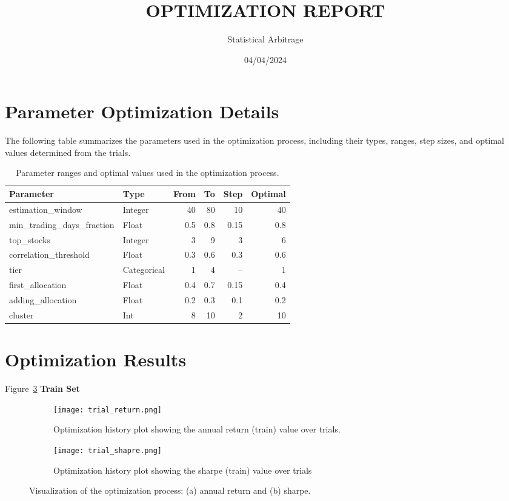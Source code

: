 \documentclass{article}
\title{OPTIMIZATION REPORT}
\author{Statistical Arbitrage}
\date{04/04/2024}
\begin{document}
\maketitle

\section{Parameter Optimization Details}

The following table summarizes the parameters used in the optimization process, including their types, ranges, step sizes, and optimal values determined from the trials.

\begin{table}[h]
\centering
\caption{Parameter ranges and optimal values used in the optimization process.}
\label{tab:parameter_ranges}
\begin{tabular}{llrrrr}
\toprule
\textbf{Parameter} & \textbf{Type} & \textbf{From} & \textbf{To} & \textbf{Step} & \textbf{Optimal} \\
\midrule
estimation\_window & Integer & 40 & 80 & 10 & 40 \\
min\_trading\_days\_fraction & Float & 0.5 & 0.8 & 0.15 & 0.8 \\
top\_stocks & Integer & 3 & 9 & 3 & 6 \\
correlation\_threshold & Float & 0.3 & 0.6 & 0.3 & 0.6 \\
tier & Categorical & 1 & 4 & -- & 1 \\
first\_allocation & Float & 0.4 & 0.7 & 0.15 & 0.4 \\
adding\_allocation & Float & 0.2 & 0.3 & 0.1 & 0.2 \\
cluster & Int & 8 & 10 & 2 & 10\\
\bottomrule
\end{tabular}
\end{table}

\section{Optimization Results}

Figure~\ref{fig:optimization_plots} \textbf{Train Set}
\begin{figure}[h!]
\centering
\begin{subfigure}{0.48\textwidth}
    \texttt{[image: trial\_return.png]}
    \caption{Optimization history plot showing the annual return (train) value over trials.}
    \label{fig:optimization_history}
\end{subfigure}
\hfill
\begin{subfigure}{0.48\textwidth}
    \texttt{[image: trial\_shapre.png]}
    \caption{Optimization history plot showing the sharpe (train) value over trials}
    \label{fig:parameter_importances}
\end{subfigure}
\caption{Visualization of the optimization process: (a) annual return and (b) sharpe.}
\label{fig:optimization_plots}
\end{figure}
\end{document}
